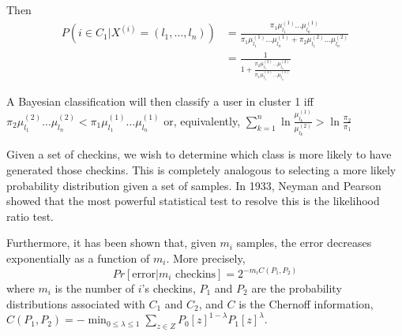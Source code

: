 Then \\
\begin{align}
P( i \in C_1 | X^{(i)} = (l_1,\ldots,l_n) ) &= \frac{\pi_1 \mu^{(1)}_{l_1}  \ldots \mu^{(1)}_{l_n} }{\pi_1 \mu^{(1)}_{l_1}  \ldots \mu^{(1)}_{l_n} + \pi_2 \mu^{(2)}_{l_1}  \ldots \mu^{(2)}_{l_n}} \\
&= \frac{1}{1 + \frac{\pi_2 \mu^{(2)}_{l_1}  \ldots \mu^{(2)}_{l_n}}{\pi_1 \mu^{(1)}_{l_1}  \ldots \mu^{(1)}_{l_n}}}
\end{align}

A Bayesian classification will then classify a user in cluster 1 iff \\
$\pi_2 \mu^{(2)}_{l_1}  \ldots \mu^{(2)}_{l_n} < \pi_1 \mu^{(1)}_{l_1}  \ldots \mu^{(1)}_{l_n}$ or, equivalently, $\sum_{k=1}^n \ln\frac{\mu^{(1)}_{l_k}}{\mu^{(2)}_{l_k}} > \ln\frac{\pi_2}{\pi_1}$

Given a set of checkins, we wish to determine which class is more likely to have generated those checkins.
This is completely analogous to selecting a more likely probability distribution given a set of samples.
In 1933, Neyman and Pearson showed that the most powerful statistical test to resolve this is the likelihood ratio test.



Furthermore, it has been shown that, given $m_i$ samples, the error decreases exponentially as a function of $m_i$.
More precisely,
\[ Pr[\textrm{error} | m_i \textrm{ checkins}] = 2^{-m_i C(P_1, P_2)} \]
where $m_i$ is the number of $i$'s checkins, 
$P_1$ and $P_2$ are the probability distributions associated with $C_1$ and $C_2$, 
and $C$ is the Chernoff information, $C(P_1, P_2) = -\min_{0 \leq \lambda \leq 1} \sum_{z \in Z} P_0[z]^{1-\lambda} P_1[z]^\lambda$.











